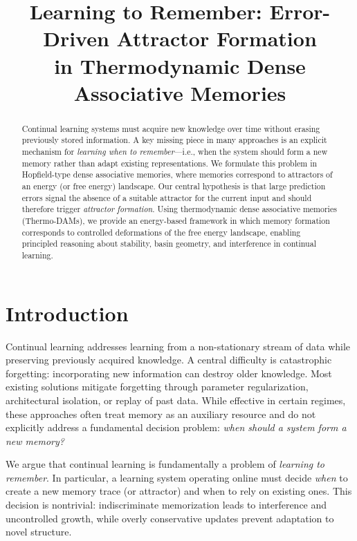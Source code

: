 \documentclass[11pt,a4paper]{article}
\title{Learning to Remember: Error-Driven Attractor Formation\\
in Thermodynamic Dense Associative Memories}
\author{}
\date{}
\begin{document}
\maketitle

\begin{abstract}
Continual learning systems must acquire new knowledge over time without erasing previously stored information.
A key missing piece in many approaches is an explicit mechanism for \emph{learning when to remember}---i.e., when the system should form a new memory rather than adapt existing representations.
We formulate this problem in Hopfield-type dense associative memories, where memories correspond to attractors of an energy (or free energy) landscape.
Our central hypothesis is that large prediction errors signal the absence of a suitable attractor for the current input and should therefore trigger \emph{attractor formation}.
Using thermodynamic dense associative memories (Thermo-DAMs), we provide an energy-based framework in which memory formation corresponds to controlled deformations of the free energy landscape, enabling principled reasoning about stability, basin geometry, and interference in continual learning.
\end{abstract}

\section{Introduction}

Continual learning addresses learning from a non-stationary stream of data while preserving previously acquired knowledge.
A central difficulty is catastrophic forgetting: incorporating new information can destroy older knowledge.
Most existing solutions mitigate forgetting through parameter regularization, architectural isolation, or replay of past data.
While effective in certain regimes, these approaches often treat memory as an auxiliary resource and do not explicitly address a fundamental decision problem: \emph{when should a system form a new memory?}

We argue that continual learning is fundamentally a problem of \emph{learning to remember}.
In particular, a learning system operating online must decide \emph{when} to create a new memory trace (or attractor) and when to rely on existing ones.
This decision is nontrivial: indiscriminate memorization leads to interference and uncontrolled growth, while overly conservative updates prevent adaptation to novel structure.
\end{document}
